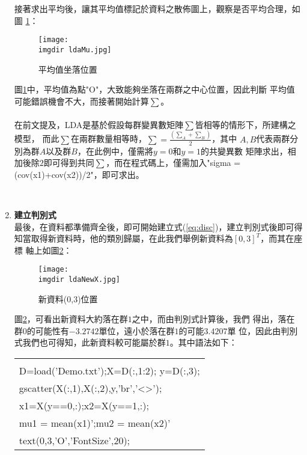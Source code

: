 \begin{enumerate}[Step 1：]
{\begin{center}
{\begin{tabular}{p{}}
						\end{tabular}
					}
					\end{center}
					接著求出平均後，讓其平均值標記於資料之散佈圖上，觀察是否平均合理，如圖							\ref{fig:ldaMu}：
					\begin{figure}[H]	
		 		 		\centering	 			 	 
   				 		\texttt{[image: \\imgdir ldaMu.jpg]} 
   			 			\caption{平均值坐落位置}   		
   			 			\label{fig:ldaMu}   			 		 
					\end{figure}
					圖\ref{fig:ldaMu}中，平均值為點"O"，大致能夠坐落在兩群之中心位置，因此判斷						平均值可能錯誤機會不大，而接著開始計算$\sum$。
					\\	
					\\											
					在前文提及，LDA是基於假設每群變異數矩陣$\sum$皆相等的情形下，所建構之模型，						而此$\sum$在兩群數量相等時，$\sum = \frac{(\sum_A + \sum_B)}{2}$，其中						$A,B$代表兩群分別為群$A$以及群$B$，在此例中，僅需將$y=0$和$y=1$的共變異數						矩陣求出，相加後除$2$即可得到共同$\sum$，而在程式碼上，僅需加入"sigma = 						(cov(x1)+cov(x2))/2"，即可求出。					
				}
				\\
				\item {\textbf{建立判別式}\\
					最後，在資料都準備齊全後，即可開始建立式(\ref{eq:disc})，建立判別式後即可得						知當取得新資料時，他的類別歸屬，在此我們舉例新資料為$[0,3]^{T}$，而其在座標						軸上如圖\ref{fig:ldaNewX}：
					\begin{figure}[H]	
		 		 		\centering	 			 	 
   				 		\texttt{[image: \\imgdir ldaNewX.jpg]} 
   			 			\caption{新資料(0,3)位置}   		
   			 			\label{fig:ldaNewX}   			 		 
					\end{figure}
					圖\ref{fig:ldaNewX}，可看出新資料大約落在群$1$之中，而由判別式計算後，我們						得出，落在群$0$的可能性有$-3.2742$單位，遠小於落在群$1$的可能$3.4207$單						位，因此由判別式我們也可得知，此新資料較可能屬於群$1$。其中語法如下：
					\begin{center}\colorbox{slight}{
						\begin{tabular}{p{}}
							\MJHmarker{\textbf{\color{darkblue}{MATLAB語法 :}}}\\
							D=load('Demo.txt');X=D(:,1:2); y=D(:,3);\\	
							gscatter(X(:,1),X(:,2),y,'br','<>');\\
							x1=X(y==0,:);x2=X(y==1,:);\\
							mu1 = mean(x1)';mu2 = mean(x2)'\\
							text(0,3,'O','FontSize',20);\\

\end{tabular}}
\end{center}}
\end{enumerate}

